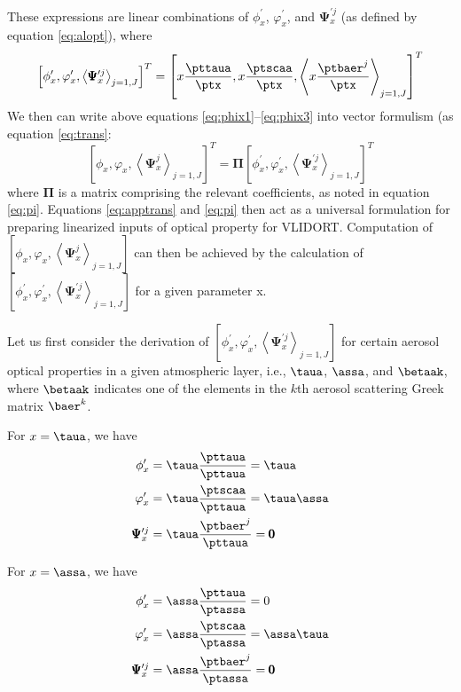 These expressions are linear combinations of $\phi_x^\prime$,
$\varphi_x^\prime$, and $\pmb{\Psi}_x^{\prime j}$ (as defined by equation
\eqref{eq:alopt}), where 
\begin{equation}
\left[ \phi_x^\prime, \varphi_x^\prime, \left<
\pmb{\Psi}_x^{\prime j}\right>_{j=1,J}\right]^T = 
\left[x\frac{\pttaua}{\ptx}, x\frac{\ptscaa}{\ptx}, 
      \left<x\frac{\ptbaer^j}{\ptx}\right>_{j=1,J} \right]^T
\end{equation}
We then can write above equations \eqref{eq:phix1}--\eqref{eq:phix3} into
vector formulism (as equation \eqref{eq:trans}:
\begin{equation}
\left[ \phi_x, \varphi_x, \left< \pmb{\Psi}_x^j\right>_{j=1,J}\right]^T
=\pmb{\Pi} \left[ \phi_x^\prime, \varphi_x^\prime, \left<
\pmb{\Psi}_x^{\prime j}\right>_{j=1,J}\right]^T \label{eq:apptrans}
\end{equation}
where $\pmb{\Pi}$ is a matrix comprising the relevant coefficients, 
as noted in equation \eqref{eq:pi}. Equations \eqref{eq:apptrans} and 
\eqref{eq:pi} then act as a universal formulation for preparing
linearized inputs of optical property for VLIDORT. Computation of
$\left[ \phi_x, \varphi_x, \left< \pmb{\Psi}_x^j\right>_{j=1,J}\right]$ 
can then be achieved by the calculation of
$\left[ \phi_x^\prime, \varphi_x^\prime, \left<\pmb{\Psi}_x^{\prime j}\right>_{j=1,J}\right]$ 
for a given parameter x.

Let us first consider the derivation of 
$\left[ \phi_x^\prime, \varphi_x^\prime, \left<\pmb{\Psi}_x^{\prime j}\right>_{j=1,J}\right]$
for certain aerosol optical properties in a given atmospheric layer, 
i.e., $\taua$, $\assa$, and $\betaak$, where $\betaak$ 
indicates one of the elements in the $k$th aerosol scattering Greek
matrix $\baer^k$. 

For $x=\taua$, we have
\begingroup
\allowdisplaybreaks
\begin{align}
\phi_x^\prime &= \taua\frac{\pttaua}{\pttaua}=\taua \label{eq:adjtau} \\
\varphi_x^\prime &= \taua\frac{\ptscaa}{\pttaua}=\taua\assa \\
\pmb{\Psi}_x^{\prime j} &= \taua\frac{\ptbaer^j}{\pttaua} =\pmb{0} 
\end{align}
\endgroup

For $x=\assa$, we have
\begingroup
\allowdisplaybreaks
\begin{align}
\phi_x^\prime &= \assa\frac{\pttaua}{\ptassa}=0 \\
\varphi_x^\prime &= \assa\frac{\ptscaa}{\ptassa}=\assa\taua \\
\pmb{\Psi}_x^{\prime j} &= \assa\frac{\ptbaer^j}{\ptassa} =\pmb{0} 
\end{align}
\endgroup

